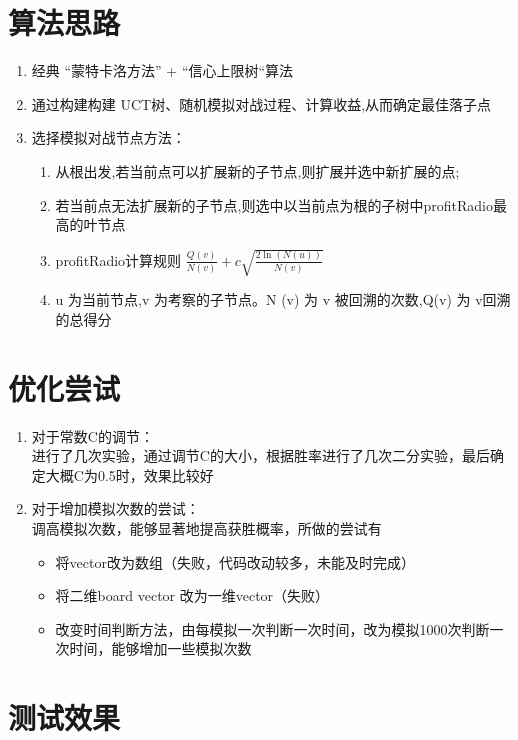 \documentclass[]{article}
\begin{document}
\section{算法思路}
\begin{enumerate}
    \item 经典 “蒙特卡洛方法” + “信心上限树“算法
    \item 通过构建构建 UCT树、随机模拟对战过程、计算收益,从而确定最佳落子点
    \item {选择模拟对战节点方法：
        \begin{enumerate}
            \item 从根出发,若当前点可以扩展新的子节点,则扩展并选中新扩展的点;
            \item 若当前点无法扩展新的子节点,则选中以当前点为根的子树中profitRadio最高的叶节点
            \item profitRadio计算规则 $\frac{Q(v)}{N(v)}+c \sqrt{\frac{2 \ln (N(u))}{N(v)}}$
            \item u 为当前节点,v 为考察的子节点。N (v) 为 v 被回溯的次数,Q(v) 为 v回溯的总得分
        \end{enumerate}
    }
\end{enumerate}

\section{优化尝试}
\begin{enumerate}
    \item{
        对于常数C的调节：\\
        进行了几次实验，通过调节C的大小，根据胜率进行了几次二分实验，最后确定大概C为0.5时，效果比较好
    } 
    \item {
        对于增加模拟次数的尝试：\\
        调高模拟次数，能够显著地提高获胜概率，所做的尝试有
        \begin{itemize}
            \item 将vector改为数组（失败，代码改动较多，未能及时完成）
            \item 将二维board vector 改为一维vector（失败）
            \item 改变时间判断方法，由每模拟一次判断一次时间，改为模拟1000次判断一次时间，能够增加一些模拟次数
        \end{itemize}
    }
\end{enumerate}

\section{测试效果}
\end{document}
